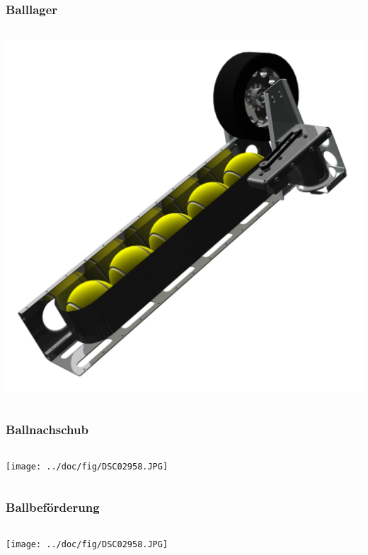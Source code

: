 \begin{frame}
    \frametitle{Balllager}
    \begin{columns}
        \begin{column}{0.8\textwidth}
            \centering
            \includegraphics[width=1.0\textwidth]{FotosM/Bild7.png}
        \end{column}
    \end{columns}
\end{frame}
\begin{frame}
    \frametitle{Ballnachschub}
    \begin{columns}
        \begin{column}{0.8\textwidth}
            \centering
            \texttt{[image: ../doc/fig/DSC02958.JPG]}
        \end{column}
    \end{columns}
\end{frame}
\begin{frame}
    \frametitle{Ballbeförderung}
    \begin{columns}
        \begin{column}{0.8\textwidth}
            \centering
            \texttt{[image: ../doc/fig/DSC02958.JPG]}
        \end{column}
    \end{columns}
\end{frame}
